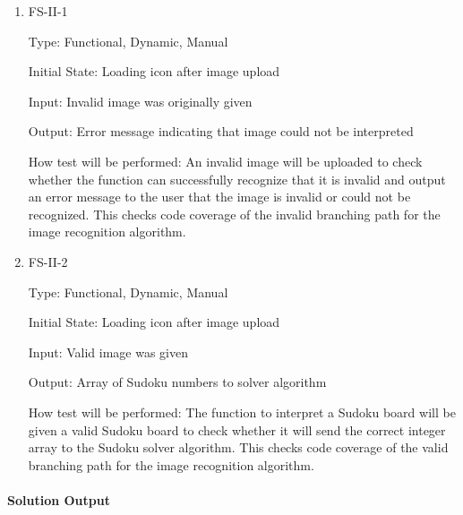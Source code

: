 \documentclass[11pt]{article}
\begin{document}
\begin{enumerate}

\item{FS-II-1\\}

Type: Functional, Dynamic, Manual
					
Initial State: Loading icon after image upload
					
Input: Invalid image was originally given
					
Output: Error message indicating that image could not be interpreted
					
How test will be performed: An invalid image will be uploaded to check whether the function can successfully recognize that it is invalid and output an error message to the user that the image is invalid or could not be recognized. This checks code coverage of the invalid branching path for the image recognition algorithm.
					
\item{FS-II-2\\}

Type: Functional, Dynamic, Manual
					
Initial State: Loading icon after image upload
					
Input: Valid image was given
					
Output: Array of Sudoku numbers to solver algorithm
					
How test will be performed: The function to interpret a Sudoku board will be given a valid Sudoku board to check whether it will send the correct integer array to the Sudoku solver algorithm. This checks code coverage of the valid branching path for the image recognition algorithm.

\end{enumerate}

\paragraph{Solution Output}
\end{document}
